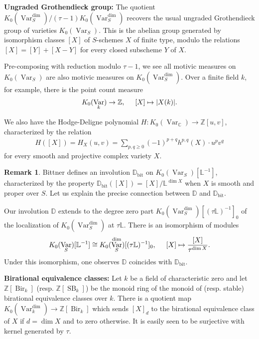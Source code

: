 \documentclass{amsart}
\theoremstyle{definition}
\newtheorem{rmk}[thm]{Remark}
\DeclareMathOperator{\Bir}{Bir}
\DeclareMathOperator{\Var}{Var}
\DeclareMathOperator{\SB}{SB}
\newcommand{\Kdim}{K_0(\Var_k^{\dim})}
\newcommand{\KdimS}{K_0(\Var_S^{\dim})}
\numberwithin{equation}{section}
\begin{document}
\textbf{Ungraded Grothendieck group:} The quotient $\KdimS / (\tau - 1) \KdimS$ recovers the usual ungraded Grothendieck group of varieties $K_0(\Var_S)$. This is the abelian group generated by isomorphism classes $[X]$ of $S$-schemes $X$ of finite type, modulo the relations $[X] = [Y]+[X-Y]$ for every closed subscheme $Y$ of $X$.

Pre-composing with reduction modulo $\tau - 1$, we see all motivic measures on $K_0(\Var_S)$ are also motivic measures on $\KdimS$. Over a finite field $k$, for example, there is the point count measure
\begin{align*}
    K_0(\Var_k) \rightarrow \mathbb{Z}, \hspace{.5cm} [X] \mapsto |X(k)|.
\end{align*}

We also have the Hodge-Deligne polynomial $H: K_0(\Var_\mathbb{C}) \rightarrow \mathbb{Z}[u,v]$, characterized by the relation
\begin{align*}
    H([X]) = H_X(u,v) = \sum_{p,q \geq 0} (-1)^{p+q} h^{p,q}(X) \cdot u^p v^q
\end{align*}
for every smooth and projective complex variety $X$. 

\begin{rmk}\label{remark bittner}
Bittner \cite[Definition $6.3$]{bittnerrelations} defines an involution $\mathbb{D}_{\mathrm{bit}}$ on $K_0(\Var_S)[\mathbb{L}^{-1}]$, characterized by the property $\mathbb{D}_{\mathrm{bit}}([X]) = [X]/\mathbb{L}^{\dim X}$ when $X$ is smooth and proper over $S$. Let us explain the precise connection between $\mathbb{D}$ and $\mathbb{D}_\mathrm{bit}$.

Our involution $\mathbb{D}$ extends to the degree zero part $K_0(\Var_S^{\dim})[(\tau \mathbb{L})^{-1}]_0$ of the localization of $K_0(\Var_S^{\dim})$ at $\tau \mathbb{L}$. There is an isomorphism of modules
\begin{align*}
    K_0(\Var_S)[\mathbb{L}^{-1}] \cong K_0(\Var_S^{\dim})[(\tau \mathbb{L})^{-1}]_0, \hspace{.5cm} [X] \mapsto \frac{[X]}{\tau^{\dim X}}.
\end{align*}
Under this isomorphism, one observes $\mathbb{D}$ coincides with $\mathbb{D}_{\mathrm{bit}}$.
\end{rmk}



\textbf{Birational equivalence classes:} Let $k$ be a field of characteristic zero and let $\mathbb{Z}[\Bir_k]$ (resp. $\mathbb{Z}[\SB_k]$) be the monoid ring of the monoid of (resp. stable) birational equivalence classes over $k$. There is a quotient map $\Kdim \rightarrow \mathbb{Z}[\Bir_k]$ which sends $[X]_d$ to the birational equivalence class of $X$ if $d=\dim X$ and to zero otherwise. It is easily seen to be surjective with kernel generated by $\tau$.
\end{document}
